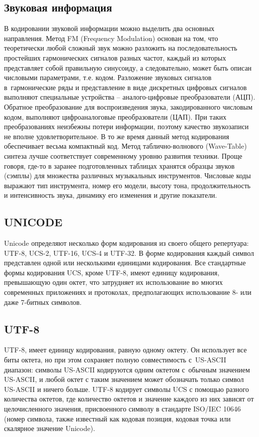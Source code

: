 \documentclass{ou}
\begin{document}
\subsection{Звуковая информация}
В кодировании звуковой информации можно выделить два основных направления. Метод FM (Frequency Modulation) основан на том, что теоретически любой сложный звук можно разложить на последовательность простейших гармонических сигналов разных частот, каждый из которых представляет собой правильную синусоиду, а следовательно, может быть описан числовыми параметрами, т.е. кодом. Разложение звуковых сигналов в~гармонические ряды и представление в виде дискретных цифровых сигналов выполняют специальные устройства -- аналого-цифровые преобразователи (АЦП). Обратное преобразование для воспроизведения звука, закодированного числовым кодом, выполняют цифроаналоговые преобразователи (ЦАП). При таких преобразованиях неизбежны потери информации, поэтому качество звукозаписи не вполне удовлетворительное. В то же время данный метод кодирования обеспечивает весьма компактный код. Метод таблично-волнового (Wave-Table) синтеза лучше соответствует современному уровню развития техники. Проще говоря, где-то в заранее подготовленных таблицах хранятся образцы звуков (сэмплы) для множества различных музыкальных инструментов. Числовые коды выражают тип инструмента, номер его модели, высоту тона, продолжительность и интенсивность звука, динамику его изменения и другие показатели.
\subsection{UNICODE}
Unicode определяют несколько форм кодирования из своего общего репертуара: UTF-8, UCS-2, UTF-16, UCS-4 и UTF-32. В форме кодирования каждый символ представлен одной или несколькими единицами кодирования. Все стандартные формы кодирования UCS, кроме UTF-8, имеют единицу кодирования, превышающую один октет, что затрудняет их использование во многих современных приложениях и протоколах, предполагающих использование 8- или даже 7-битных символов.
\subsection{UTF-8}
UTF-8, имеет единицу кодирования, равную одному октету. Он использует все биты октета, но при этом сохраняет полную совместимость с~US-ASCII диапазон: символы US-ASCII кодируются одним октетом с~обычным значением US-ASCII, и любой октет с таким значением может обозначать только символ US-ASCII и ничего больше. UTF-8 кодирует символы UCS с помощью разного количества октетов, где количество октетов и значение каждого из них зависят от целочисленного значения, присвоенного символу в стандарте ISO/IEC 10646 (номер символа, также известный как кодовая позиция, кодовая точка или скалярное значение Unicode).
\end{document}
